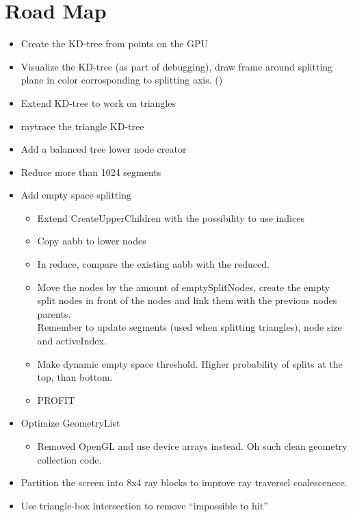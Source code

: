 \section*{Road Map}


\begin{itemize}
\item \color{green}Create the KD-tree from points on the GPU \checkmark
\item Visualize the KD-tree (as part of debugging), draw frame around
  splitting plane in color corrosponding to splitting axis. (\checkmark)
\item Extend KD-tree to work on triangles \checkmark
\item raytrace the triangle KD-tree \checkmark
\item Add a balanced tree lower node creator \checkmark
\item Reduce more than 1024 segments \checkmark
\item Add empty space splitting
  \begin{itemize}
    \item Extend CreateUpperChildren with the possibility to use indices \checkmark
    \item Copy aabb to lower nodes \checkmark
    \item In reduce, compare the existing aabb with the reduced. \checkmark
    \item Move the nodes by the amount of emptySplitNodes, create the
      empty split nodes in front of the nodes and link them with the
      previous nodes parents.\\ Remember to update segments (used when
      splitting triangles), node size and activeIndex. \checkmark
    \item \color{red}Make dynamic empty space threshold. Higher probability of
      splits at the top, than bottom.
    \item PROFIT
  \end{itemize}
\item Optimize GeometryList
  \begin{itemize}
  \item Removed OpenGL and use device arrays instead. Oh such clean
    geometry collection code. \checkmark
  \end{itemize}
\item Partition the screen into 8x4 ray blocks to improve ray
  traversel coalescenece. \checkmark
\color{red} \item Use triangle-box intersection to remove ``impossible to hit''

\end{itemize}
